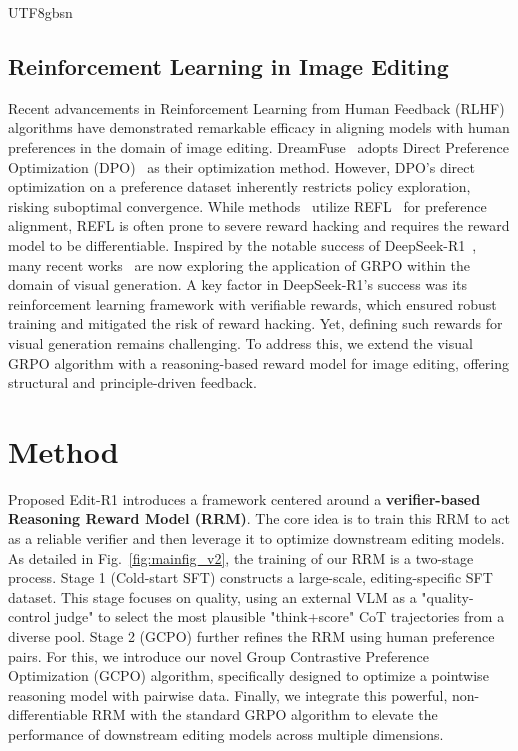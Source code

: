 \documentclass{llmxive}
\begin{document}
\begin{CJK*}{UTF8}{gbsn}
\subsection{Reinforcement Learning in Image Editing}
Recent advancements in Reinforcement Learning from Human Feedback (RLHF) algorithms have demonstrated remarkable efficacy in aligning models with human preferences in the domain of image editing. 
DreamFuse~\citep{huang2025dreamfuse} adopts Direct Preference Optimization (DPO)~\citep{wallace2024diffusion} as their optimization method. 
However, DPO's direct optimization on a preference dataset inherently restricts policy exploration, risking suboptimal convergence.
While methods~\citep{gong2025onereward,ren2024byteedit} utilize REFL~\citep{xu2023imagereward} for preference alignment, REFL is often prone to severe reward hacking and requires the reward model to be differentiable.
Inspired by the notable success of DeepSeek-R1~\citep{guo2025deepseek}, many recent works~\citep{xue2025dancegrpo, liu2025flow} are now exploring the application of GRPO within the domain of visual generation. 
A key factor in DeepSeek-R1’s success was its reinforcement learning framework with verifiable rewards, which ensured robust training and mitigated the risk of reward hacking. Yet, defining such rewards for visual generation remains challenging. To address this, we extend the visual GRPO algorithm with a reasoning-based reward model for image editing, offering structural and principle-driven feedback.


\section{Method}

Proposed Edit-R1 introduces a framework centered around a \textbf{verifier-based Reasoning Reward Model (RRM)}. 
The core idea is to train this RRM to act as a reliable verifier and then leverage it to optimize downstream editing models. 
As detailed in Fig.~\ref{fig:mainfig_v2}, the training of our RRM is a two-stage process. 
Stage 1 (Cold-start SFT) constructs a large-scale, editing-specific SFT dataset. This stage focuses on quality, using an external VLM as a "quality-control judge" to select the most plausible "think+score" CoT trajectories from a diverse pool.
Stage 2 (GCPO) further refines the RRM using human preference pairs. For this, we introduce our novel Group Contrastive Preference Optimization (GCPO) algorithm, specifically designed to optimize a pointwise reasoning model with pairwise data. 
Finally, we integrate this powerful, non-differentiable RRM with the standard GRPO algorithm to elevate the performance of downstream editing models across multiple dimensions.



\end{CJK*}
\end{document}
